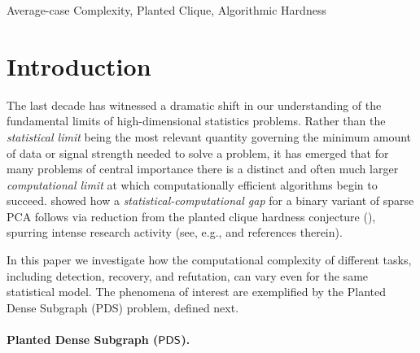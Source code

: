 \documentclass[final,12pt]{colt2023} %
\newcommand\1[1]{\mathbb{I}_{\left\{#1\right\}}}
\begin{document}
\begin{abstract}
In this paper 
we demonstrate that a slight variation of the Planted Clique Hypothesis with \emph{secret leakage} (introduced in Brennan and Bresler (2020)), implies a detection-recovery gap for PDS. 
In the same vein, we also obtain a sharp lower bound for refutation, yielding a detection-refutation gap. 
Our methods build on the framework of Brennan and Bresler (2020) to construct average-case reductions mapping secret leakage Planted Clique to appropriate target problems. 
\end{abstract}

\begin{keywords}%
  Average-case Complexity, Planted Clique, Algorithmic Hardness
\end{keywords}

\section{Introduction}

The last decade has witnessed a dramatic shift in our understanding of the fundamental limits of high-dimensional statistics problems. Rather than the \emph{statistical limit} being the most relevant quantity governing the minimum amount of data or signal strength needed to solve a problem, it has emerged that for many problems of central importance there is a distinct and often much larger \emph{computational limit} at which computationally efficient algorithms begin to succeed. \cite{Berthet13} showed how a \emph{statistical-computational gap} for a binary variant of sparse PCA follows via reduction from the planted clique hardness conjecture (), spurring intense research activity (see, e.g., \cite{BB20} and references therein). 

In this paper we investigate how the computational complexity of different tasks, including detection, recovery, and refutation, can vary even for the same statistical model. The phenomena of interest are exemplified by the Planted Dense Subgraph (PDS) problem, defined next.

\paragraph{Planted Dense Subgraph ($\mathsf{PDS}$).}
\end{document}
